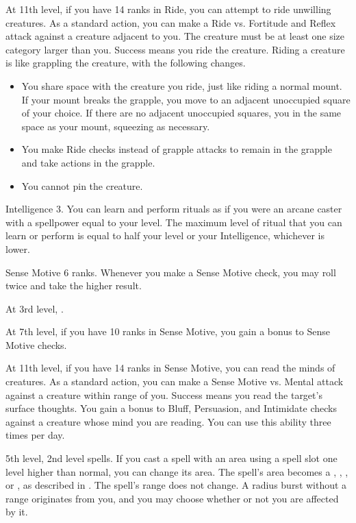     At 11th level, if you have 14 ranks in Ride, you can attempt to ride unwilling creatures.
    As a standard action, you can make a Ride vs. Fortitude and Reflex attack against a creature adjacent to you.
    The creature must be at least one size category larger than you.
    Success means you ride the creature.
    Riding a creature is like grappling the creature, with the following changes.
    \begin{itemize}
        \item You share space with the creature you ride, just like riding a normal mount.
            If your mount breaks the grapple, you move to an adjacent unoccupied square of your choice.
            If there are no adjacent unoccupied squares, you in the same space as your mount, squeezing as necessary.
        \item You make Ride checks instead of grapple attacks to remain in the grapple and take actions in the grapple.
        \item You cannot pin the creature.
    \end{itemize}

    \featpre Intelligence 3.
    \featben You can learn and perform rituals as if you were an arcane caster with a spellpower equal to your level.
    The maximum level of ritual that you can learn or perform is equal to half your level or your Intelligence, whichever is lower.

    \featpre Sense Motive 6 ranks.
    \featben Whenever you make a Sense Motive check, you may roll twice and take the higher result.

    At 3rd level, \tdash.

    At 7th level, if you have 10 ranks in Sense Motive, you gain a  bonus to Sense Motive checks.

    At 11th level, if you have 14 ranks in Sense Motive, you can read the minds of creatures.
    As a standard action, you can make a Sense Motive vs. Mental attack against a creature within \rngmed range of you.
    Success means you read the target's surface thoughts.
    You gain a  bonus to Bluff, Persuasion, and Intimidate checks against a creature whose mind you are reading.
    You can use this ability three times per day.
    \magical

    \featpre 5th level, 2nd level spells.
    \featben If you cast a spell with an area using a spell slot one level higher than normal, you can change its area.
    The spell's area becomes a \areasmall, \areamed, \arealarge, or \areahuge {}, as described in .
    The spell's range does not change.
    A radius burst without a range originates from you, and you may choose whether or not you are affected by it.

